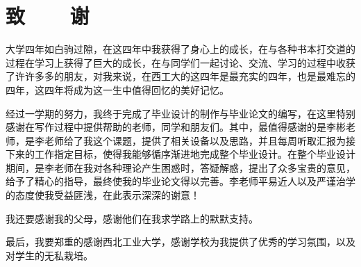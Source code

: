 \renewcommand{\baselinestretch}{1.5}
\fontsize{12pt}{13pt}\selectfont
{}
\chapter*{致~~~~谢}
	\par 大学四年如白驹过隙，在这四年中我获得了身心上的成长，在与各种书本打交道的过程在学习上获得了巨大的成长，在与同学们一起讨论、交流、学习的过程中收获了许许多多的朋友，对我来说，在西工大的这四年是最充实的四年，也是最难忘的四年，这四年将成为这一生中值得回忆的美好记忆。
	\par 经过一学期的努力，我终于完成了毕业设计的制作与毕业论文的编写，在这里特别感谢在写作过程中提供帮助的老师，同学和朋友们。其中，最值得感谢的是李彬老师，是李老师给了我这个课题，提供了相关设备以及思路，并且每周听取汇报为接下来的工作指定目标，使得我能够循序渐进地完成整个毕业设计。在整个毕业设计期间，是李老师在我对各种理论产生困惑时，答疑解惑，提出了众多宝贵的意见，给予了精心的指导，最终使我的毕业论文得以完善。李老师平易近人以及严谨治学的态度使我受益匪浅，在此表示深深的谢意！
	\par 我还要感谢我的父母，感谢他们在我求学路上的默默支持。
	\par 最后，我要郑重的感谢西北工业大学，感谢学校为我提供了优秀的学习氛围，以及对学生的无私栽培。
\clearpage